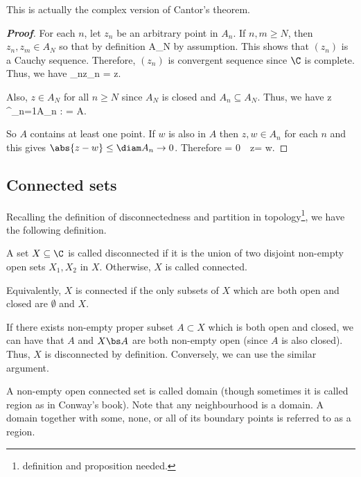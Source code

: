 \begin{remark}
This is actually the complex version of Cantor's theorem.
\end{remark}

\begin{proof}[\bf Proof]
For each $n$, let $z_n$ be an arbitrary point in $A_n$. If $n,m\geq N$, then $z_n,z_m\in A_N$ so that by definition
\be
{} \leq \diam A_N 
\ee
by assumption. This shows that $(z_n)$ is a Cauchy sequence. Therefore, $(z_n)$ is convergent sequence since $\C$ is complete. Thus, we have
\be
\lim_{n\to \infty}z_n = z.
\ee

Also, $z\in A_N$ for all $n\geq N$ since $A_N$ is closed and $A_n\subseteq A_N$. Thus, we have
\be
z \in \bigcap^\infty_{n=1}A_n : = A.
\ee

So $A$ contains at least one point. If $w$ is also in $A$ then $z,w\in A_n$ for each $n$ and this gives $\abs{z-w} \leq \diam A_n \to 0$. Therefore
\be
{} = 0\ \ra\ z= w.
\ee
\end{proof}




\subsection{Connected sets}

Recalling the definition of disconnectedness and partition in topology\footnote{definition and proposition needed.}, we have the following definition.

\begin{definition}\label{def:connected_set_complex_space}
A set $X\subseteq \C$ is called disconnected if it is the union of two disjoint non-empty open sets $X_1,X_2$ in $X$. Otherwise, $X$ is called connected.
\end{definition}

\begin{remark}
Equivalently, $X$ is connected if the only subsets of $X$ which are both open and closed are $\emptyset$ and $X$.

If there exists non-empty proper subset $A\subset X$ which is both open and closed, we can have that $A$ and $X \bs A$ are both non-empty open (since $A$ is also closed). Thus, $X$ is disconnected by definition. Conversely, we can use the similar argument.


A non-empty open connected set is called domain (though sometimes it is called region as in Conway's book\cite{Conway_1978_a}). Note that any neighbourhood is a domain. A domain together with some, none, or all of its boundary points is referred to as a region.
\end{remark}

